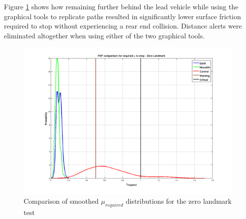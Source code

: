Figure \ref{fig:zero_mu_dist} shows how remaining further behind the lead vehicle while using the graphical tools to replicate paths resulted in significantly lower surface friction required to stop without experiencing a rear end collision. Distance alerts were eliminated altogether when using either of the two graphical tools.
\begin{figure}[ht] \centering %
    \includegraphics[width=6in]{./figs/zero_landmark_mu_distribution.png}
    \caption{Comparison of smoothed $\mu_{required}$ distributions for the zero landmark test} \label{fig:zero_mu_dist}
\end{figure}